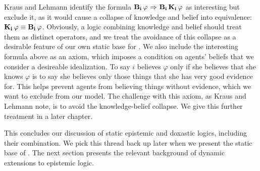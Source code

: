 Kraus and Lehmann identify the formula $\mathbf{B}_{\mathbf{i}}\,\varphi {\ \Rightarrow \ } \mathbf{B}_{\mathbf{i}}\,\mathbf{K}_{\mathbf{i}}\,\varphi$ as interesting but exclude it, as it would cause a collapse of knowledge and belief into equivalence: $\mathbf{K}_{\mathbf{i}}\,\varphi \equiv \mathbf{B}_{\mathbf{i}}\,\varphi$. Obviously, a logic combining knowledge and belief should treat them as distinct operators, and we treat the avoidance of this collapse as a desirable feature of our own static base for \DASL. We also include the interesting formula above as an axiom, which imposes a condition on agents' beliefs that we consider a desireable idealization. To say $i$ believes $\varphi$ only if she believes that she knows $\varphi$ is to say she believes only those things that she has very good evidence for. This helps prevent agents from believing things without evidence, which we want to exclude from our model. The challenge with this axiom, as Kraus and Lehmann note, is to avoid the knowledge-belief collapse. We give this further treatment in a later chapter.

This concludes our discussion of static epistemic and doxastic logics, including their combination. We pick this thread back up later when we present the static base of \DASL. The next section presents the relevant background of dynamic extensions to epistemic logic.





